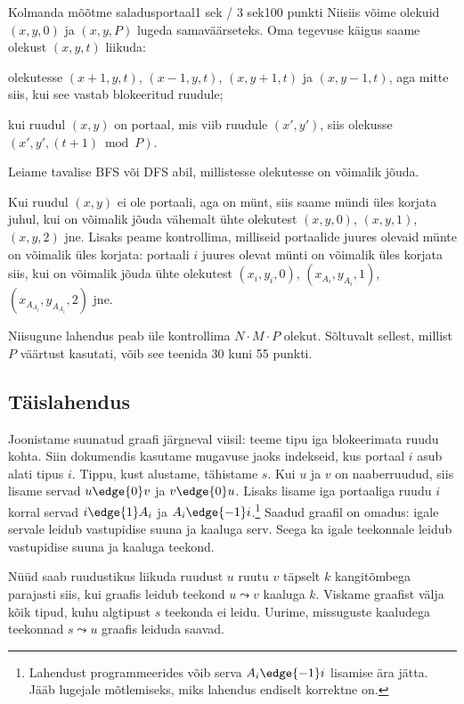 \begin{yl}{5}{Kolmanda mõõtme saladus}{portaal}{1 sek / 3 sek}{100 punkti}
  Niisiis võime olekuid $(x, y, 0)$ ja $(x, y, P)$ lugeda samaväärseteks.
  Oma tegevuse käigus saame olekust $(x, y, t)$ liikuda:
  \begin{xitem}
  \item olekutesse $(x + 1, y, t)$, $(x - 1, y, t)$, $(x, y + 1, t)$ ja $(x, y - 1, t)$,
    aga mitte siis, kui see vastab blokeeritud ruudule;
  \item kui ruudul $(x, y)$ on portaal, mis viib ruudule $(x', y')$,
    siis olekusse $(x', y', (t + 1) \bmod{P})$.
  \end{xitem}
  Leiame tavalise BFS või DFS abil, millistesse olekutesse on võimalik jõuda.

  Kui ruudul $(x, y)$ ei ole portaali, aga on münt, siis saame mündi üles korjata juhul,
  kui on võimalik jõuda vähemalt ühte olekutest $(x, y, 0)$, $(x, y, 1)$, $(x, y, 2)$ jne.
  Lisaks peame kontrollima, milliseid portaalide juures olevaid münte on võimalik üles korjata:
  portaali $i$ juures olevat münti on võimalik üles korjata siis, kui on võimalik jõuda
  ühte olekutest $(x_i, y_i, 0)$, $(x_{A_i}, y_{A_i}, 1)$, $(x_{A_{A_i}}, y_{A_{A_i}}, 2)$ jne.

  Niisugune lahendus peab üle kontrollima $N \cdot M \cdot P$ olekut. Sõltuvalt sellest, millist $P$
  väärtust kasutati, võib see teenida 30 kuni 55 punkti.

  \subsection*{Täislahendus}

  Joonistame suunatud graafi järgneval viisil: teeme tipu iga blokeerimata ruudu
  kohta. Siin dokumendis kasutame mugavuse jaoks indekseid, kus portaal $i$ asub alati
  tipus $i$. Tippu, kust alustame, tähistame $s$.
  Kui $u$ ja $v$ on naaberruudud, siis lisame servad $u \edge{0} v$
  ja $v \edge{0} u$. Lisaks lisame iga portaaliga ruudu $i$ korral servad
  $i \edge{1} A_i$ ja $A_i \edge{-1} i$.\footnote{Lahendust programmeerides võib
    serva $A_i \edge{-1} i$ lisamise ära jätta. Jääb lugejale mõtlemiseks, miks
    lahendus endiselt korrektne on.} Saadud graafil on omadus: igale servale leidub vastupidise
  suuna ja kaaluga serv. Seega ka igale teekonnale leidub vastupidise suuna ja kaaluga
  teekond.

  Nüüd saab ruudustikus liikuda ruudust $u$ ruutu $v$ täpselt $k$ kangitõmbega
  parajasti siis, kui graafis leidub teekond $u \leadsto v$ kaaluga $k$.
  Viskame graafist välja kõik tipud, kuhu algtipust $s$ teekonda ei leidu.
  Uurime, missuguste kaaludega teekonnad $s \leadsto u$ graafis leiduda saavad.


\end{yl}
